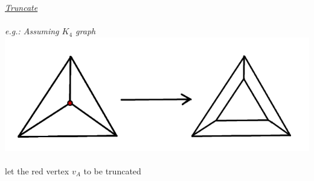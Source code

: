 \documentclass{article}
\begin{document}
%
\newpage
\underline{\emph{Truncate}}\\
\\
\emph{e.g.: Assuming $K_{4}$ graph}
\\
\includegraphics[scale=0.30]{truncate.png}
\\ \\
let the red vertex $v_{A}$ to be truncated\\
\\
\end{document}
